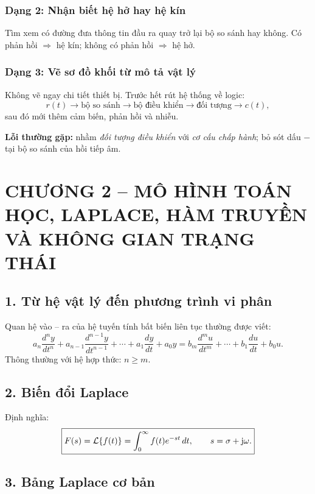 \subsubsection*{Dạng 2: Nhận biết hệ hở hay hệ kín}

Tìm xem có đường đưa thông tin đầu ra quay trở lại bộ so sánh hay không.
Có phản hồi $\Rightarrow$ hệ kín; không có phản hồi $\Rightarrow$ hệ hở.

\subsubsection*{Dạng 3: Vẽ sơ đồ khối từ mô tả vật lý}

Không vẽ ngay chi tiết thiết bị. Trước hết rút hệ thống về logic:
\[
r(t)\rightarrow \text{bộ so sánh}\rightarrow \text{bộ điều khiển}
\rightarrow \text{đối tượng}\rightarrow c(t),
\]
sau đó mới thêm cảm biến, phản hồi và nhiễu.

\medskip
\noindent\textbf{Lỗi thường gặp:}
nhầm \emph{đối tượng điều khiển} với \emph{cơ cấu chấp hành};
bỏ sót dấu $-$ tại bộ so sánh của hồi tiếp âm.

\clearpage
\section*{CHƯƠNG 2 -- MÔ HÌNH TOÁN HỌC, LAPLACE, HÀM TRUYỀN VÀ KHÔNG GIAN TRẠNG THÁI}

\subsection*{1. Từ hệ vật lý đến phương trình vi phân}

Quan hệ vào -- ra của hệ tuyến tính bất biến liên tục thường được viết:
\[
a_n\frac{d^ny}{dt^n}
+a_{n-1}\frac{d^{n-1}y}{dt^{n-1}}
+\cdots+a_1\frac{dy}{dt}+a_0y
=
b_m\frac{d^mu}{dt^m}
+\cdots+b_1\frac{du}{dt}+b_0u.
\]
Thông thường với hệ hợp thức: $n\ge m$.

\subsection*{2. Biến đổi Laplace}

Định nghĩa:
\[
\boxed{
F(s)=\mathcal{L}\{f(t)\}=\int_0^\infty f(t)e^{-st}\,dt,
\qquad s=\sigma+\mathrm{j}\omega.
}
\]

\subsection*{3. Bảng Laplace cơ bản}


